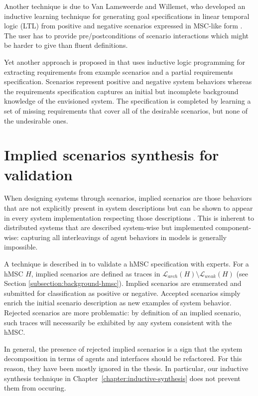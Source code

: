 Another technique is due to Van Lamsweerde and Willemet, who developed an inductive learning technique for generating goal specifications in linear temporal logic (LTL) from positive and negative scenarios expressed in MSC-like form \cite{VanLamsweerde:1998}. The user has to provide pre/postconditions of scenario interactions which might be harder to give than fluent definitions.

Yet another approach is proposed in \cite{Alrajeh:2007} that uses inductive logic programming for extracting requirements from example scenarios and a partial requirements specification. Scenarios represent positive and negative system behaviors whereas the requirements specification captures an initial but incomplete background knowledge of the envisioned system. The specification is completed by learning a set of missing requirements that cover all of the desirable scenarios, but none of the undesirable ones.


\section{Implied scenarios synthesis for validation}

When designing systems through scenarios, implied scenarios are those behaviors that are not explicitly present in system descriptions but can be shown to appear in every system implementation respecting those descriptions \cite{Alur:2000, Uchitel:2004}. This is inherent to distributed systems that are described system-wise but implemented component-wise: capturing all interleavings of agent behaviors in models is generally impossible.

A technique is described in \cite{Uchitel:2004} to validate a hMSC specification with experts. For a hMSC $H$, implied scenarios are defined as traces in $\mathcal{L}_{arch}(H) \setminus \mathcal{L}_{weak}(H)$ (see Section \ref{subsection:background-hmsc}). Implied scenarios are enumerated and submitted for classification as positive or negative. Accepted scenarios simply enrich the initial scenario description as new examples of system behavior. Rejected scenarios are more problematic: by definition of an implied scenario, such traces will necessarily be exhibited by any system consistent with the hMSC. 

In general, the presence of rejected implied scenarios is a sign that the system decomposition in terms of agents and interfaces should be refactored. For this reason, they have been mostly ignored in the thesis. In particular, our inductive synthesis technique in Chapter~\ref{chapter:inductive-synthesis} does not prevent them from occuring.

